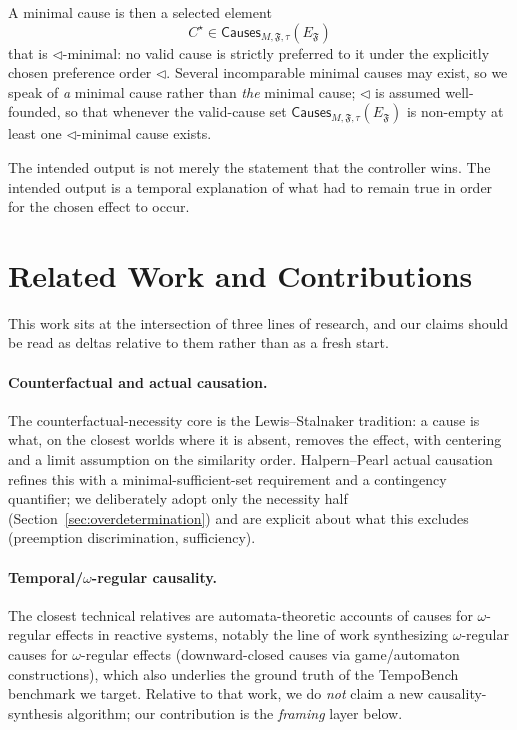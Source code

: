 \documentclass[11pt]{article}
\theoremstyle{remark}
\newcommand{\Frame}{\mathfrak{F}}
\begin{document}
A minimal cause is then a selected element
\[
  C^\star\in \mathsf{Causes}_{M,\Frame,\tau}(E_{\Frame})
\]
that is \(\triangleleft\)-minimal: no valid cause is strictly preferred to it
under the explicitly chosen preference order \(\triangleleft\). Several
incomparable minimal causes may exist, so we speak of \emph{a} minimal cause
rather than \emph{the} minimal cause; \(\triangleleft\) is assumed
well-founded, so that whenever the valid-cause set
\(\mathsf{Causes}_{M,\Frame,\tau}(E_{\Frame})\) is non-empty at least one
\(\triangleleft\)-minimal cause exists.

The intended output is not merely the statement that the controller wins. The
intended output is a temporal explanation of what had to remain true in order
for the chosen effect to occur.

\section{Related Work and Contributions}
\label{sec:related}

This work sits at the intersection of three lines of research, and our claims
should be read as deltas relative to them rather than as a fresh start.

\paragraph{Counterfactual and actual causation.} The counterfactual-necessity
core is the Lewis--Stalnaker tradition: a cause is what, on the closest worlds
where it is absent, removes the effect, with centering and a limit assumption on
the similarity order. Halpern--Pearl actual causation refines this with a
minimal-sufficient-set requirement and a contingency quantifier; we deliberately
adopt only the necessity half (Section~\ref{sec:overdetermination}) and are
explicit about what this excludes (preemption discrimination, sufficiency).

\paragraph{Temporal/$\omega$-regular causality.} The closest technical relatives
are automata-theoretic accounts of causes for $\omega$-regular effects in
reactive systems, notably the line of work synthesizing $\omega$-regular causes
for $\omega$-regular effects (downward-closed causes via game/automaton
constructions), which also underlies the ground truth of the TempoBench benchmark
we target. Relative to that work, we do \emph{not} claim a new causality-synthesis
algorithm; our contribution is the \emph{framing} layer below.
\end{document}
